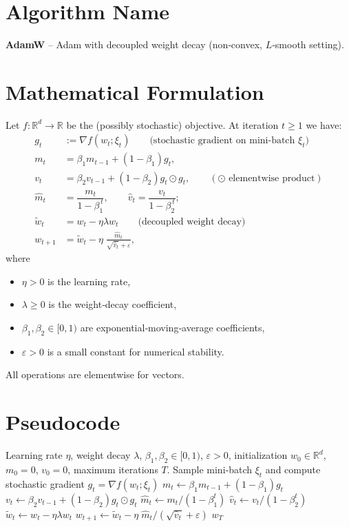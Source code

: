 \documentclass{article}
\newcommand{\RR}{\mathbb{R}}
\begin{document}
\section*{Algorithm Name}
\textbf{AdamW} – Adam with decoupled weight decay (non‑convex, $L$‑smooth setting).

\section*{Mathematical Formulation}
Let $f:\RR^{d}\rightarrow\RR$ be the (possibly stochastic) objective.
At iteration $t\ge 1$ we have:
\[
\begin{aligned}
g_t &:= \nabla f(w_t;\xi_t) \qquad\text{(stochastic gradient on mini‑batch }\xi_t)\\[4pt]
m_t &= \beta_1 m_{t-1} + (1-\beta_1) g_t, \\
v_t &= \beta_2 v_{t-1} + (1-\beta_2) g_t\odot g_t, \qquad (\odot\text{ elementwise product})\\[4pt]
\hat m_t &= \dfrac{m_t}{1-\beta_1^{\,t}},\qquad 
\hat v_t = \dfrac{v_t}{1-\beta_2^{\,t}};\\[4pt]
\tilde w_t &= w_t - \eta\lambda w_t \qquad\text{(decoupled weight decay)}\\[4pt]
w_{t+1} &= \tilde w_t - \eta\;\frac{\hat m_t}{\sqrt{\hat v_t}+\varepsilon},
\end{aligned}
\]
where
\begin{itemize}
    \item $\eta>0$ is the learning rate,
    \item $\lambda\ge0$ is the weight‑decay coefficient,
    \item $\beta_1,\beta_2\in[0,1)$ are exponential‑moving‑average coefficients,
    \item $\varepsilon>0$ is a small constant for numerical stability.
\end{itemize}
All operations are elementwise for vectors.

\section*{Pseudocode}
\begin{algorithm}[H]
\caption{AdamW}
\begin{algorithmic}[1]
\Require Learning rate $\eta$, weight decay $\lambda$, $\beta_1,\beta_2\in[0,1)$, $\varepsilon>0$,
        initialization $w_0\in\RR^{d}$, $m_0=0$, $v_0=0$, maximum iterations $T$.
    \State Sample mini‑batch $\xi_t$ and compute stochastic gradient $g_t=\nabla f(w_t;\xi_t)$
    \State $m_t \gets \beta_1 m_{t-1} + (1-\beta_1)g_t$
    \State $v_t \gets \beta_2 v_{t-1} + (1-\beta_2) g_t\odot g_t$
    \State $\hat m_t \gets m_t/(1-\beta_1^{t})$
    \State $\hat v_t \gets v_t/(1-\beta_2^{t})$
    \State $\tilde w_t \gets w_t - \eta\lambda w_t$ 
    \State $w_{t+1} \gets \tilde w_t - \eta\; \hat m_t/(\sqrt{\hat v_t}+\varepsilon)$
\EndFor
\State \Return $w_{T}$
\end{algorithmic}
\end{algorithm}
\end{document}
